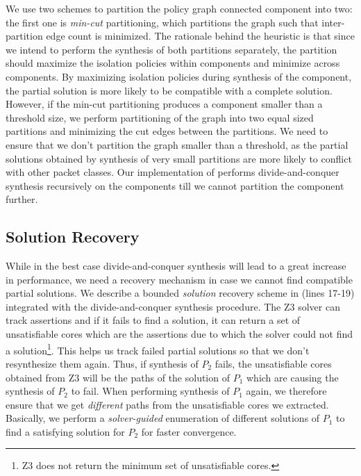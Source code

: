 We use two schemes to partition the policy graph connected component into two: the
first one is \emph{min-cut} partitioning, which partitions the graph
such that inter-partition edge count is minimized. The
rationale behind the heuristic is that since we intend to perform the
synthesis of both partitions separately, the partition should maximize
the isolation policies within components and minimize across
components. By maximizing isolation policies during synthesis of the
component, the partial solution is more likely to be compatible with a
complete solution. However, if the min-cut partitioning produces a
component smaller than a threshold size, we perform partitioning of
the graph into two equal sized partitions and minimizing the cut edges
between the partitions. We need to ensure that we don't partition the
graph smaller than a threshold, as the partial solutions obtained by
synthesis of very small partitions are more likely to conflict with
other packet classes. Our implementation of \Name performs
divide-and-conquer synthesis recursively on the components till we cannot partition the
component further. 

\subsection{Solution Recovery} \label{sec:recovery}
While in the best case divide-and-conquer synthesis  will lead to a great
increase in performance, we need a recovery mechanism in case we cannot find
compatible partial solutions.  We describe a bounded \emph{solution} recovery
scheme in (lines 17-19) integrated with the divide-and-conquer
synthesis procedure.  The Z3 solver can track assertions and if it
fails to find a solution, it can return a set of unsatisfiable cores
which are the assertions due to which the solver could not find a
solution\footnote{Z3 does not return the minimum set of unsatisfiable
  cores.}.  This helps us track failed partial solutions so that we 
don't resynthesize them again. 
Thus, if synthesis of $P_2$ fails, the unsatisfiable cores
obtained from Z3 will be the paths of the solution of $P_1$ which are
causing the synthesis of $P_2$ to fail. 
When performing synthesis of $P_1$
again, we therefore ensure that we get \emph{different} paths from the
unsatisfiable cores we extracted.  Basically, we perform a 
\emph{solver-guided} enumeration of different solutions of $P_1$ to
find a satisfying solution for $P_2$ for faster convergence.

